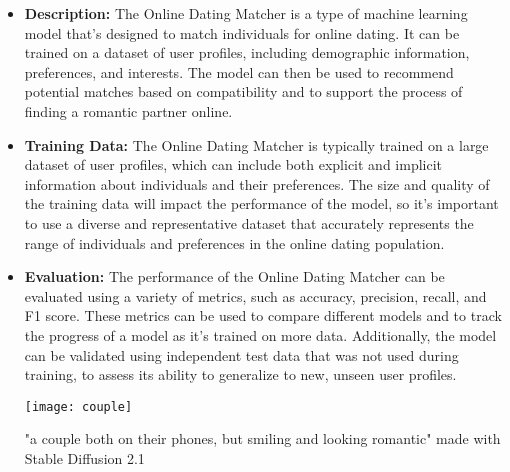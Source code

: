 \begin{itemize}
    \item \textbf{Description:} The Online Dating Matcher is a type of machine learning model that's designed to match individuals for online dating. It can be trained on a dataset of user profiles, including demographic information, preferences, and interests. The model can then be used to recommend potential matches based on compatibility and to support the process of finding a romantic partner online.
    \item \textbf{Training Data:} The Online Dating Matcher is typically trained on a large dataset of user profiles, which can include both explicit and implicit information about individuals and their preferences. The size and quality of the training data will impact the performance of the model, so it's important to use a diverse and representative dataset that accurately represents the range of individuals and preferences in the online dating population.
    \item \textbf{Evaluation:} The performance of the Online Dating Matcher can be evaluated using a variety of metrics, such as accuracy, precision, recall, and F1 score. These metrics can be used to compare different models and to track the progress of a model as it's trained on more data. Additionally, the model can be validated using independent test data that was not used during training, to assess its ability to generalize to new, unseen user profiles.

\begin{pdf}
\begin{marginfigure}[-5.5cm]
        \texttt{[image: couple]}
        \caption{"a couple both on their phones, but smiling and looking romantic" made with Stable Diffusion 2.1}
\end{marginfigure}
\end{pdf}


\end{itemize}
